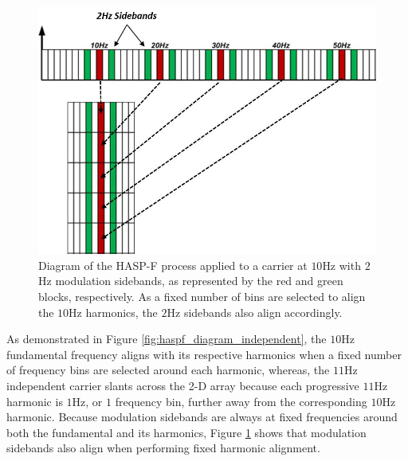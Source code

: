 \begin{figure}[tb]
	\includegraphics[width=\textwidth]{./misc_graphics/haspf_diagram_modulation.jpg}
	\centering
	\caption{Diagram of the HASP-F process applied to a carrier at $10$Hz with $2$Hz modulation sidebands, as represented by the red and green blocks, respectively.  As a fixed number of bins are selected to align the $10$Hz harmonics, the $2$Hz sidebands also align accordingly.}
	\label{fig:haspf_diagram_modulation}
\end{figure}

As demonstrated in Figure \ref{fig:haspf_diagram_independent}, the $10$Hz fundamental frequency aligns with its respective harmonics when a fixed number of frequency bins are selected around each harmonic, whereas, the $11$Hz independent carrier slants across the 2-D array because each progressive $11$Hz harmonic is $1$Hz, or $1$ frequency bin, further away from the corresponding $10$Hz harmonic.  Because modulation sidebands are always at fixed frequencies around both the fundamental and its harmonics, Figure \ref{fig:haspf_diagram_modulation} shows that modulation sidebands also align when performing fixed harmonic alignment. 

